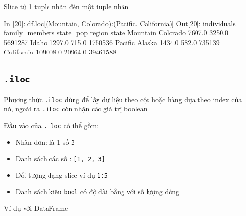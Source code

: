 \documentclass[
]{book}
\newenvironment{Shaded}{\begin{snugshade}}{\end{snugshade}}
\newcommand{\DecValTok}[1]{\textcolor[rgb]{0.00,0.00,0.81}{#1}}
\newcommand{\FloatTok}[1]{\textcolor[rgb]{0.00,0.00,0.81}{#1}}
\newcommand{\NormalTok}[1]{#1}
\newcommand{\StringTok}[1]{\textcolor[rgb]{0.31,0.60,0.02}{#1}}
\begin{document}
Slice từ 1 tuple nhãn đến một tuple nhãn

\begin{Shaded}
\begin{Highlighting}[]
\NormalTok{In [}\DecValTok{20}\NormalTok{]: df.loc[(}\StringTok{\textquotesingle{}Mountain\textquotesingle{}}\NormalTok{, }\StringTok{\textquotesingle{}Colorado\textquotesingle{}}\NormalTok{):(}\StringTok{\textquotesingle{}Pacific\textquotesingle{}}\NormalTok{, }\StringTok{\textquotesingle{}California\textquotesingle{}}\NormalTok{)]}
\NormalTok{Out[}\DecValTok{20}\NormalTok{]:}
\NormalTok{                     individuals  family\_members  state\_pop}
\NormalTok{region   state                                             }
\NormalTok{Mountain Colorado         }\FloatTok{7607.0}          \FloatTok{3250.0}    \DecValTok{5691287}
\NormalTok{         Idaho            }\FloatTok{1297.0}           \FloatTok{715.0}    \DecValTok{1750536}
\NormalTok{Pacific  Alaska           }\FloatTok{1434.0}           \FloatTok{582.0}     \DecValTok{735139}
\NormalTok{         California     }\FloatTok{109008.0}         \FloatTok{20964.0}   \DecValTok{39461588}
\end{Highlighting}
\end{Shaded}

\subsection{\texorpdfstring{\texttt{.iloc}}{.iloc}}\label{iloc}

Phương thức \texttt{.iloc} dùng để lấy dữ liệu theo cột hoặc hàng dựa theo index của nó, ngoài ra \texttt{.iloc} còn nhận các giá trị boolean.

Đầu vào của \texttt{.iloc} có thể gồm:

\begin{itemize}
\item
  Nhãn đơn: là 1 số \texttt{3}
\item
  Danh sách các số : \texttt{{[}1,\ 2,\ 3{]}}
\item
  Đối tượng dạng slice ví dụ \texttt{1:5}
\item
  Danh sách kiểu \texttt{bool} có độ dài bằng với số lượng dòng
\end{itemize}

Ví dụ với DataFrame
\end{document}
